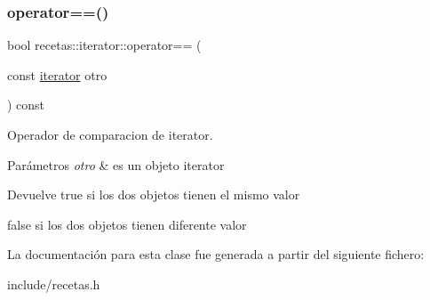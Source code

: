 \subsubsection{\texorpdfstring{operator==()}{operator==()}}
{\footnotesize\ttfamily bool recetas\+::iterator\+::operator== (\begin{DoxyParamCaption}\item[{const \hyperlink{classrecetas_1_1iterator}{iterator}}]{otro }\end{DoxyParamCaption}) const}



Operador de comparacion de iterator. 


\begin{DoxyParams}{Parámetros}
{\em otro} & es un objeto iterator \\
\hline
\end{DoxyParams}
\begin{DoxyReturn}{Devuelve}
true si los dos objetos tienen el mismo valor 

false si los dos objetos tienen diferente valor 
\end{DoxyReturn}


La documentación para esta clase fue generada a partir del siguiente fichero\+:\begin{DoxyCompactItemize}
\item 
include/recetas.\+h\end{DoxyCompactItemize}
